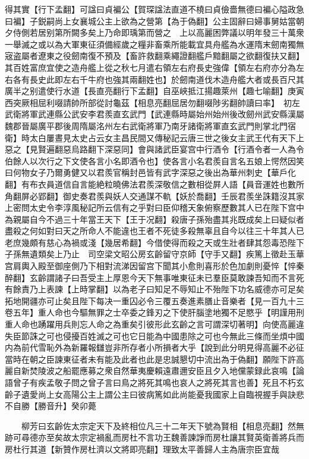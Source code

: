得其實【行下孟翻】可諡曰貞褊公【賀琛諡法直道不橈曰貞儉嗇無德曰褊心隘政急曰褊】子鋭嗣尚上女襄城公主上欲為之營第【為于偽翻】公主固辭曰婦事舅姑當朝夕侍側若居别第所闕多矣上乃命即瑀第而營之　上以高麗困弊議以明年發三十萬衆一舉滅之或以為大軍東征須備經歲之糧非畜乘所能載宜具舟艦為水運隋末劒南獨無宼盗屬者遼東之役劒南復不預及【畜許救翻乘繩證翻艦戶黯翻屬之欲翻復扶又翻】其百姓富庶宜使之造舟艦上從之秋七月遣右領左右府長史強偉【領左右府亦分為左右各有長史此即左右千牛府也強其兩翻姓也】於劒南道伐木造舟艦大者或長百尺其廣半之别遣使行水道【長直亮翻行下孟翻】自巫峽抵江揚趣萊州【趣七喻翻】庚寅西突厥相屈利啜請帥所部從討龜茲【相息亮翻屈居勿翻啜陟劣翻帥讀曰率】　初左武衛將軍武連縣公武安李君羨直玄武門【武連縣時屬始州始州後改劒州武安縣漢屬魏郡晉屬廣平郡後周隋屬洺州左右武衛將軍乃南牙諸衛將軍直玄武門則掌北門宿衛】時太白屢晝見太史占云女主昌民間又傳秘記云唐三世之後女主武王代有天下上惡之【見賢遍翻惡烏路翻下深惡同】會與諸武臣宴宫中行酒令【行酒令者一人為令伯餘人以次行之下文使各言小名即酒令也】使各言小名君羨自言名五娘上愕然因笑曰何物女子乃爾勇健又以君羨官稱封邑皆有武字深惡之後出為華州刺史【華戶化翻】有布衣員道信自言能絶粒曉佛法君羨深敬信之數相從屛人語【員音運姓也數所角翻屏必郢翻】御史奏君羨與妖人交通謀不軌【妖於喬翻】壬辰君羨坐誅籍沒其家上密問太史令李淳風秘記所云信有之乎對曰臣仰稽天象俯察歷數其人已在陛下宫中為親屬自今不過三十年當王天下【王于况翻】殺唐子孫殆盡其兆既成矣上曰疑似者盡殺之何如對曰天之所命人不能違也王者不死徒多殺無辜且自今以往三十年其人已老庶幾頗有慈心為禍或淺【幾居希翻】今借使得而殺之天或生壯者肆其怨毒恐陛下子孫無遺類矣上乃止　司空梁文昭公房玄齡留守京師【守手又翻】疾篤上徵赴玉華宫肩輿入殿至御座側乃下相對流涕因留宫下聞其小愈則喜形於色加劇則憂悴【悴秦醉翻】玄齡謂諸子曰吾受主上厚恩今天下無事唯東征未已羣臣莫敢諫吾知而不言死有餘責乃上表諫【上時掌翻】以為老子曰知足不辱知止不殆陛下功名威德亦可足矣拓地開疆亦可止矣且陛下每决一重囚必令三覆五奏進素膳止音樂者【見一百九十三卷五年】重人命也今驅無罪之士卒委之鋒刃之下使肝腦塗地獨不足愍乎【明謹用刑重人命也踴躍用兵則忘人命之為重矣引彼形此玄齡之言可謂深切著明】向使高麗違失臣節誅之可也侵擾百姓滅之可也它日能為中國患除之可也今無此三條而坐煩中國内為前代雪恥外為新羅報讎豈非所存者小所損者大乎【說到此分明見得高麗不必征當時在朝之臣諫東征者未有能及此者也此是忠誠懇切中流出為于偽翻】願陛下許高麗自新焚陵波之船罷應募之衆自然華夷慶賴遠肅邇安臣且夕入地儻蒙録此哀鳴【論語曾子有疾孟敬子問之曾子言曰鳥之將死其鳴也哀人之將死其言也善】死且不朽玄齡子遺愛尚上女高陽公主上謂公主曰彼病篤如此尚能憂我國家上自臨視握手與訣悲不自勝【勝音升】癸卯薨

　　柳芳曰玄齡佐太宗定天下及終相位凡三十二年天下號為賢相【相息亮翻】然無跡可尋德亦至矣故太宗定禍亂而房杜不言功王魏善諫諍而房杜讓其賢英衛善將兵而房杜行其道【新贊作房杜濟以文將即亮翻】理致太平善歸人主為唐宗臣宜哉


